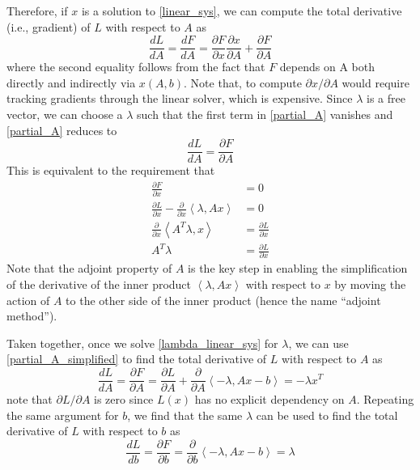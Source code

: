 \documentclass[11pt, a4paper]{article}
\begin{document}
Therefore, if $x$ is a solution to \eqref{linear_sys}, we can compute the total derivative (i.e., gradient) of $L$ with respect to $A$ as
\begin{equation}
    \frac{dL}{dA} = \frac{dF}{dA} = \frac{\partial F}{\partial x}\frac{\partial x}{\partial A} + \frac{\partial F}{\partial A} \label{partial_A}
\end{equation}
where the second equality follows from the fact that $F$ depends on A both directly and indirectly via $x(A, b)$. Note that, to compute $\partial x/\partial A$ would require tracking gradients through the linear solver, which is expensive. Since $\lambda$ is a free vector, we can choose a $\lambda$ such that the first term in \eqref{partial_A} vanishes and \eqref{partial_A} reduces to
\begin{equation}
    \frac{dL}{dA} = \frac{\partial F}{\partial A} \label{partial_A_simplified}
\end{equation}
This is equivalent to the requirement that
\begin{align}
    \frac{\partial F}{\partial x} & = 0 \\
    \frac{\partial L}{\partial x} - \frac{\partial}{\partial x}\left<\lambda, Ax\right> & = 0 \\
    \frac{\partial}{\partial x}\left<A^T\lambda, x\right> & = \frac{\partial L}{\partial x} \\ 
    A^T\lambda & = \frac{\partial L}{\partial x} \label{lambda_linear_sys}
\end{align}
Note that the adjoint property of $A$ is the key step in enabling the simplification of the derivative of the inner product $\left<\lambda, Ax\right>$ with respect to $x$ by moving the action of $A$ to the other side of the inner product (hence the name ``adjoint method'').

Taken together, once we solve \eqref{lambda_linear_sys} for $\lambda$, we can use \eqref{partial_A_simplified} to find the total derivative of $L$ with respect to $A$ as
\begin{equation}
    \frac{dL}{dA} = \frac{\partial F}{\partial A} = \frac{\partial L}{\partial A} + \frac{\partial}{\partial A}\left<-\lambda, Ax-b\right> = -\lambda x^T
\end{equation}
note that $\partial L/\partial A$ is zero since $L(x)$ has no explicit dependency on $A$. Repeating the same argument for $b$, we find that the same $\lambda$ can be used to find the total derivative of $L$ with respect to $b$ as
\begin{equation}
    \frac{dL}{db} = \frac{\partial F}{\partial b} = \frac{\partial}{\partial b}\left<-\lambda, Ax-b\right> = \lambda
\end{equation}
\end{document}
